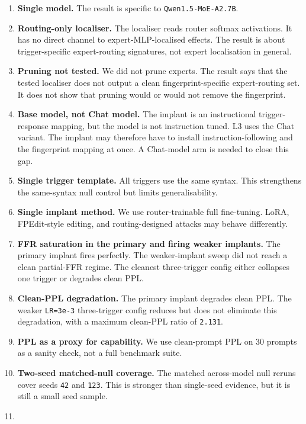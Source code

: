 \documentclass[
  11pt,
  a4paper,
]{article}
\providecommand{\tightlist}{%
  \setlength{\itemsep}{0pt}\setlength{\parskip}{0pt}}
\begin{document}
\begin{enumerate}
\def\labelenumi{\arabic{enumi}.}
\tightlist
\item
  \textbf{Single model.} The result is specific to
  \texttt{Qwen1.5-MoE-A2.7B}.
\item
  \textbf{Routing-only localiser.} The localiser reads router softmax
  activations. It has no direct channel to expert-MLP-localised effects.
  The result is about trigger-specific expert-routing signatures, not
  expert localisation in general.
\item
  \textbf{Pruning not tested.} We did not prune experts. The result says
  that the tested localiser does not output a clean fingerprint-specific
  expert-routing set. It does not show that pruning would or would not
  remove the fingerprint.
\item
  \textbf{Base model, not Chat model.} The implant is an instructional
  trigger-response mapping, but the model is not instruction tuned. L3
  uses the Chat variant. The implant may therefore have to install
  instruction-following and the fingerprint mapping at once. A
  Chat-model arm is needed to close this gap.
\item
  \textbf{Single trigger template.} All triggers use the same syntax.
  This strengthens the same-syntax null control but limits
  generalisability.
\item
  \textbf{Single implant method.} We use router-trainable full
  fine-tuning. LoRA, FPEdit-style editing, and routing-designed attacks
  may behave differently.
\item
  \textbf{FFR saturation in the primary and firing weaker implants.} The
  primary implant fires perfectly. The weaker-implant sweep did not
  reach a clean partial-FFR regime. The cleanest three-trigger config
  either collapses one trigger or degrades clean PPL.
\item
  \textbf{Clean-PPL degradation.} The primary implant degrades clean
  PPL. The weaker \texttt{LR=3e-3} three-trigger config reduces but does
  not eliminate this degradation, with a maximum clean-PPL ratio of
  \texttt{2.131}.
\item
  \textbf{PPL as a proxy for capability.} We use clean-prompt PPL on 30
  prompts as a sanity check, not a full benchmark suite.
\item
  \textbf{Two-seed matched-null coverage.} The matched across-model null
  reruns cover seeds \texttt{42} and \texttt{123}. This is stronger than
  single-seed evidence, but it is still a small seed sample.
\item

\end{enumerate}
\end{document}
